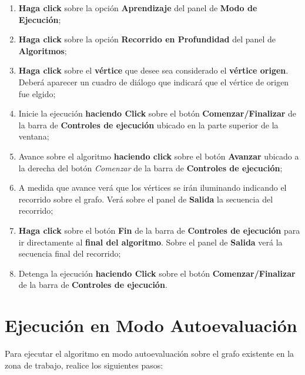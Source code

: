 \documentclass{book}
\begin{document}
\begin{enumerate}
	\itemsep=8pt \topsep=0pt \partopsep=0pt \parskip=0pt \parsep=0pt

	\item \textbf{Haga click} sobre la opción \textbf{Aprendizaje} del panel de \textbf{Modo de Ejecución};

	\item \textbf{Haga click} sobre la opción \textbf{Recorrido en Profundidad} del panel de \textbf{Algoritmos};

	\item \textbf{Haga click} sobre el \textbf{vértice} que desee sea considerado el \textbf{vértice origen}. Deberá aparecer un cuadro de diálogo que indicará que el vértice de origen fue elgido;

	\item Inicie la ejecución \textbf{haciendo Click} sobre el botón \textbf{Comenzar/Finalizar} de la barra de \textbf{Controles de ejecución} ubicado en la parte superior de la ventana;

	\item Avance sobre el algoritmo \textbf{haciendo click} sobre el botón \textbf{Avanzar} ubicado a la derecha del botón \textit{Comenzar} de la barra de \textbf{Controles de ejecución};

	\item A medida que avance verá que los vértices se irán iluminando indicando el recorrido sobre el grafo. Verá sobre el panel de \textbf{Salida} la secuencia del recorrido;

	\item \textbf{Haga click} sobre el botón \textbf{Fin} de la barra de \textbf{Controles de ejecución} para ir directamente al \textbf{final del algoritmo}. Sobre el panel de \textbf{Salida} verá la secuencia final del recorrido;

	\item Detenga la ejecución \textbf{haciendo Click} sobre el botón \textbf{Comenzar/Finalizar} de la barra de \textbf{Controles de ejecución}.

\end{enumerate}
\medskip



\section{Ejecución en Modo Autoevaluación}

Para ejecutar el algoritmo en modo autoevaluación sobre el grafo existente en la zona de trabajo, realice los siguientes pasos:
\medskip
\end{document}
